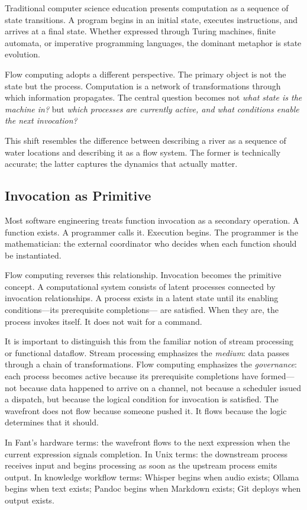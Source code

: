 \documentclass[12pt, a4paper]{article}
\begin{document}
Traditional computer science education presents computation as a
sequence of state transitions. A program begins in an initial state,
executes instructions, and arrives at a final state. Whether expressed
through Turing machines, finite automata, or imperative programming
languages, the dominant metaphor is state evolution.

Flow computing adopts a different perspective. The primary object is
not the state but the process. Computation is a network of
transformations through which information propagates. The central
question becomes not \emph{what state is the machine in?} but
\emph{which processes are currently active, and what conditions enable
the next invocation?}

This shift resembles the difference between describing a river as a
sequence of water locations and describing it as a flow system. The
former is technically accurate; the latter captures the dynamics that
actually matter.

\subsection{Invocation as Primitive}

Most software engineering treats function invocation as a secondary
operation. A function exists. A programmer calls it. Execution begins.
The programmer is the mathematician: the external coordinator who
decides when each function should be instantiated.

Flow computing reverses this relationship. Invocation becomes the
primitive concept. A computational system consists of latent processes
connected by invocation relationships. A process exists in a latent
state until its enabling conditions---its prerequisite completions---
are satisfied. When they are, the process invokes itself. It does not
wait for a command.

It is important to distinguish this from the familiar notion of stream
processing or functional dataflow. Stream processing emphasizes the
\emph{medium}: data passes through a chain of transformations. Flow
computing emphasizes the \emph{governance}: each process becomes active
because its prerequisite completions have formed---not because data
happened to arrive on a channel, not because a scheduler issued a
dispatch, but because the logical condition for invocation is satisfied.
The wavefront does not flow because someone pushed it. It flows because
the logic determines that it should.

In Fant's hardware terms: the wavefront flows to the next expression
when the current expression signals completion. In Unix terms: the
downstream process receives input and begins processing as soon as the
upstream process emits output. In knowledge workflow terms: Whisper
begins when audio exists; Ollama begins when text exists; Pandoc begins
when Markdown exists; Git deploys when output exists.
\end{document}
